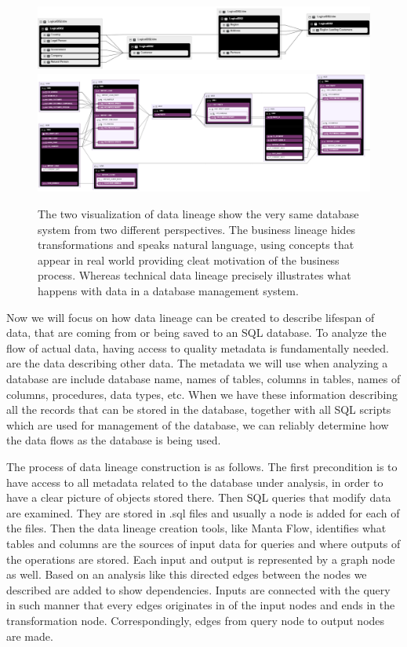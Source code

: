 \begin{figure}[H]
	\centering
	\includegraphics[width=14cm]{../img/BusinessLineage}
	\includegraphics[width=14cm]{../img/TechnicalLineage}
	\caption[Technical Lineage versus Business Lineage]{The two visualization of data lineage show the very same database system from two different perspectives. The business lineage hides transformations and speaks natural language, using concepts that appear in real world providing cleat motivation of the business process. 
		Whereas technical data lineage precisely illustrates what happens with data in a database management system.}
	\label{BusinessVsTechnicalLineage}
\end{figure}

Now we will focus on how data lineage can be created to describe lifespan of data, that are coming from or being saved to an SQL database.
To analyze the flow of actual data, having access to quality metadata is fundamentally needed.
 are the data describing other data. The metadata we will use when analyzing a database are include database name, names of tables, columns in tables, names of columns, procedures, data types, etc.
When we have these information describing all the records that can be stored in the database, together with all SQL scripts which are used for management of the database, we can reliably determine how the data flows as the database is being used.

The process of data lineage construction is as follows. The first precondition is to have access to all metadata related to the database under analysis, in order to have a clear picture of objects stored there. 
Then SQL queries that modify data are examined. They are stored in .sql files and usually a node is added for each of the files. Then the data lineage creation tools, like Manta Flow, identifies what tables and columns are the sources of input data for queries and where outputs of the operations are stored. Each input and output is represented by a graph node as well. Based on an analysis like this directed edges between the nodes we described are added to show dependencies. Inputs are connected with the query in such manner that every edges originates in of the input nodes and ends in the transformation node. Correspondingly, edges from query node to output nodes are made.


